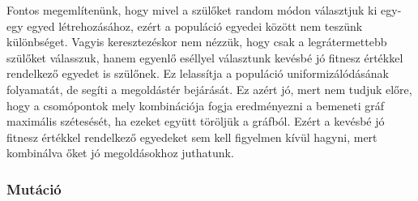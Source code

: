 Fontos megemlítenünk, hogy mivel a szülőket random módon választjuk ki egy-egy egyed létrehozásához,
ezért a populáció egyedei között nem teszünk különbséget.
Vagyis keresztezéskor nem nézzük, hogy csak a legrátermettebb szülőket válasszuk,
hanem egyenlő eséllyel választunk kevésbé jó fitnesz értékkel rendelkező egyedet is szülőnek.
Ez lelassítja a populáció uniformizálódásának folyamatát, de segíti a megoldástér bejárását.
Ez azért jó, mert nem tudjuk előre, hogy a csomópontok mely kombinációja
fogja eredményezni a bemeneti gráf maximális szétesését, ha ezeket együtt töröljük a gráfból.
Ezért a kevésbé jó fitnesz értékkel rendelkező egyedeket sem kell figyelmen kívül hagyni,
mert kombinálva őket jó megoldásokhoz juthatunk.

\subsubsection{Mutáció}



